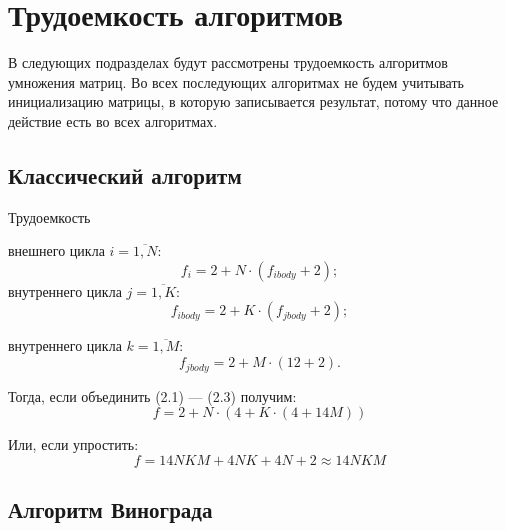 \clearpage

\section{Трудоемкость алгоритмов}

В следующих подразделах будут рассмотрены трудоемкость алгоритмов
умножения матриц.
Во всех последующих алгоритмах не будем учитывать инициализацию
матрицы, в которую записывается результат, потому что данное действие
есть во всех алгоритмах.

\subsection{Классический алгоритм}

Трудоемкость
\begin{itemize}
    \itemm внешнего цикла $i = \overline{1,N}$:
    \begin{equation}
        f_i = 2 + N\cdot (f_{ibody} + 2);
    \end{equation}
    \itemm внутреннего цикла $j = \overline{1,K}$:
    \begin{equation}
        f_{ibody} = 2 + K \cdot (f_{jbody} + 2);
    \end{equation}

    \itemm внутреннего цикла $k = \overline{1, M}$:
    \begin{equation}
        f_{jbody} = 2 + M \cdot (12 + 2).
    \end{equation}
\end{itemize}

Тогда, если объединить (2.1) --- (2.3) получим:
\begin{equation}
    f = 2 + N \cdot
    (
        4 + K \cdot
        (
            4 + 14M
        )
    )
\end{equation}

Или, если упростить:
\begin{equation}
    f = 14NKM + 4NK + 4N + 2 \approx 14NKM
\end{equation}


\subsection{Алгоритм Винограда}

